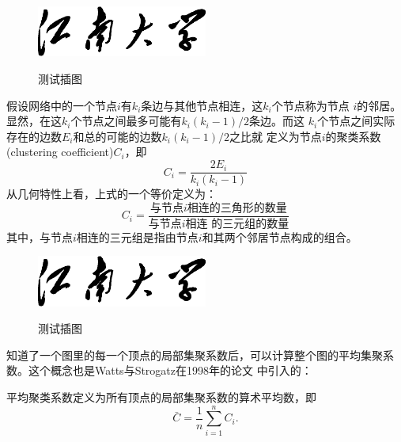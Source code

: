 \begin{definition}[局部聚类系数]


\begin{figure}[htbp]
  \centering
  \includegraphics[width= 0.5\textwidth]{jnuname.eps}\\
  \caption{测试插图}\label{fig:test5}
\end{figure}

假设网络中的一个节点$i$有$k_i$条边与其他节点相连，这$k_i$个节点称为节点
$i$的邻居。显然，在这$k_i$个节点之间最多可能有$k_i(k_i-1)/2$条边。而这
$k_i$个节点之间实际存在的边数$E_i$和总的可能的边数$k_i(k_i-1)/2$之比就
定义为节点$i$的聚类系数(clustering coefficient)$C_i$，即
\begin{equation}\label{eq:clustering_coefficient}
    C_i = \frac{2E_i}{k_i(k_i-1)}
\end{equation}
从几何特性上看，上式的一个等价定义为：
\begin{equation}\label{eq:clustering_coefficient_triangle}
    C_i = \frac{\text{与节点$i$相连的三角形的数量}}{\text{与节点$i$相连
        的三元组的数量}}
\end{equation}
其中，与节点$i$相连的三元组是指由节点$i$和其两个邻居节点构成的组合。
\end{definition}

\begin{figure}[htbp]
  \centering
  \includegraphics[width= 0.5\textwidth]{jnuname.eps}\\
  \caption{测试插图}\label{fig:test6}
\end{figure}

知道了一个图里的每一个顶点的局部集聚系数后，可以计算整个图的平均集聚系
数。这个概念也是Watts与Strogatz在1998年的论文
\cite{watts1998smallworld}中引入的：

\begin{definition}[平均聚类系数]
平均聚类系数定义为所有顶点的局部集聚系数的算术平均数，即
\begin{equation}
    \bar{C} = \frac{1}{n}\sum_{i=1}^{n} C_i.
\end{equation}
\end{definition}

